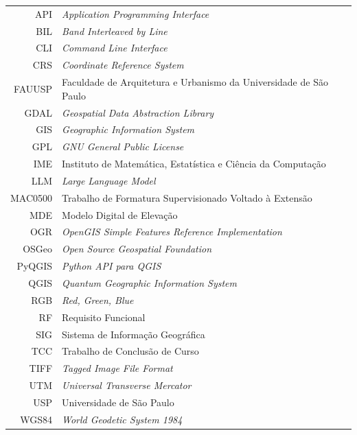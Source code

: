 \documentclass[a4paper,12pt,twoside,english,brazilian]{book}
\begin{document}
\begin{tabular}{rl}
  API     & \emph{Application Programming Interface}                          \\
  BIL     & \emph{Band Interleaved by Line}                                   \\
  CLI     & \emph{Command Line Interface}                                     \\
  CRS     & \emph{Coordinate Reference System}                                \\
  FAUUSP  & Faculdade de Arquitetura e Urbanismo da Universidade de São Paulo \\
  GDAL    & \emph{Geospatial Data Abstraction Library}                        \\
  GIS     & \emph{Geographic Information System}                              \\
  GPL     & \emph{GNU General Public License}                                 \\
  IME     & Instituto de Matemática, Estatística e Ciência da Computação      \\
  LLM     & \emph{Large Language Model}                                       \\
  MAC0500 & Trabalho de Formatura Supervisionado Voltado à Extensão           \\
  MDE     & Modelo Digital de Elevação                                        \\
  OGR     & \emph{OpenGIS Simple Features Reference Implementation}           \\
  OSGeo   & \emph{Open Source Geospatial Foundation}                          \\
  PyQGIS  & \emph{Python API para QGIS}                                       \\
  QGIS    & \emph{Quantum Geographic Information System}                      \\
  RGB     & \emph{Red, Green, Blue}                                           \\
  RF      & Requisito Funcional                                               \\
  SIG     & Sistema de Informação Geográfica                                  \\
  TCC     & Trabalho de Conclusão de Curso                                    \\
  TIFF    & \emph{Tagged Image File Format}                                   \\
  UTM     & \emph{Universal Transverse Mercator}                              \\
  USP     & Universidade de São Paulo                                         \\
  WGS84   & \emph{World Geodetic System 1984}                                 \\
\end{tabular}
\end{document}
